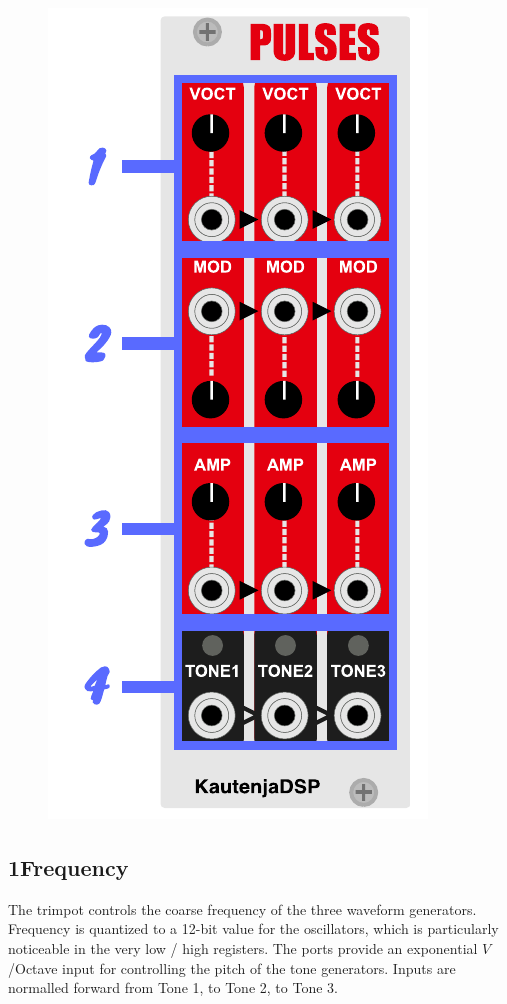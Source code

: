 \documentclass[12pt,letter]{article}
\begin{document}
\begin{figure}[!htp]
\centering
\includegraphics{Interface}
\end{figure}

\subsection*{1{\quad}Frequency}

The trimpot controls the coarse frequency of the three waveform generators. Frequency is quantized to a 12-bit value for the oscillators, which is particularly noticeable in the very low / high registers. The ports provide an exponential $V$/Octave input for controlling the pitch of the tone generators. Inputs are normalled forward from Tone 1, to Tone 2, to Tone 3.
\end{document}
